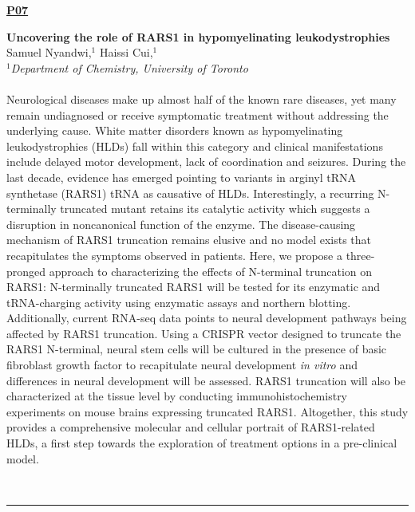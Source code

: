\documentclass[titlepage,oneside,openany,10pt]{book}
\newenvironment{posterabs}[4] %
        {
	\begin{flushright}
                \underline{\textbf{#4}}
        \end{flushright}
        \textbf{#1}\\%
        #2\\%
        \textit{#3}\\\\%
        }
        {
        \\
        \noindent\rule{15cm}{0.5pt}%
        }
\begin{document}
\begin{posterabs}
	{Uncovering the role of RARS1 in hypomyelinating leukodystrophies}
	{Samuel Nyandwi,$^{1}$ Haissi Cui,$^{1}$}
	{
	$^1$Department of Chemistry, University of Toronto
	}
	{P07}
	Neurological diseases make up almost half of the known rare diseases, yet many remain undiagnosed or receive symptomatic treatment without addressing the underlying cause. White matter disorders known as hypomyelinating leukodystrophies (HLDs) fall within this category and clinical manifestations include delayed motor development, lack of coordination and seizures. During the last decade, evidence has emerged pointing to variants in arginyl tRNA synthetase (RARS1) tRNA as causative of HLDs. Interestingly, a recurring N-terminally truncated mutant retains its catalytic activity which suggests a disruption in noncanonical function of the enzyme. The disease-causing mechanism of RARS1 truncation remains elusive and no model exists that recapitulates the symptoms observed in patients. Here, we propose a three-pronged approach to characterizing the effects of N-terminal truncation on RARS1: N-terminally truncated RARS1 will be tested for its enzymatic and tRNA-charging activity using enzymatic assays and northern blotting. Additionally, current RNA-seq data points to neural development pathways being affected by RARS1 truncation. Using a CRISPR vector designed to truncate the RARS1 N-terminal, neural stem cells will be cultured in the presence of basic fibroblast growth factor to recapitulate neural development \emph{in vitro} and differences in neural development will be assessed. RARS1 truncation will also be characterized at the tissue level by conducting immunohistochemistry experiments on mouse brains expressing truncated RARS1. Altogether, this study provides a comprehensive molecular and cellular portrait of RARS1-related HLDs, a first step towards the exploration of treatment options in a pre-clinical model.
	\label{NyandwiS}
\end{posterabs}

\newpage
\end{document}
